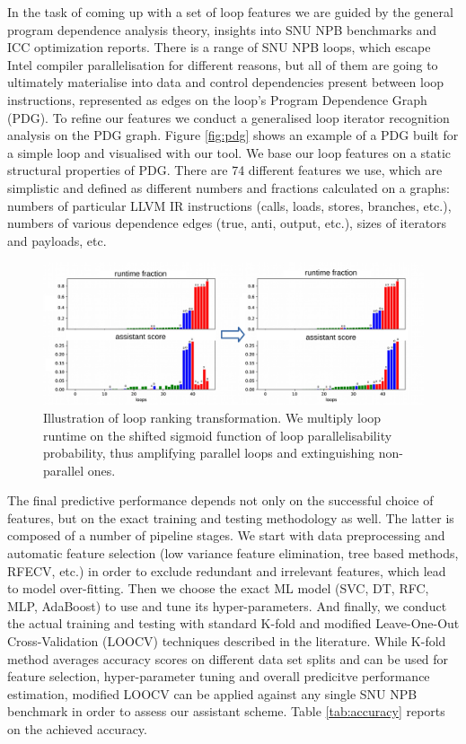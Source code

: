 \documentclass{acaces}
\begin{document}
\quad In the task of coming up with a set of loop features we are guided by the general program dependence analysis theory, insights into SNU NPB benchmarks and ICC optimization reports. There is a range of SNU NPB loops, which escape Intel compiler parallelisation for different reasons, but all of them are going to ultimately materialise into data and control dependencies present between loop instructions, represented as edges on the loop's Program Dependence Graph (PDG). To refine our features we conduct a generalised loop iterator recognition \cite{Manilov:2018:GPI:3178372.3179511} analysis on the PDG graph. Figure \ref{fig:pdg} shows an example of a PDG built for a simple loop and visualised with our tool. We base our loop features on a static structural properties of PDG. There are 74 different features we use, which are simplistic and defined as different numbers and fractions calculated on a graphs: numbers of particular LLVM IR instructions (calls, loads, stores, branches, etc.), numbers of various dependence edges (true, anti, output, etc.), sizes of iterators and payloads, etc.\newline\null
\begin{figure}
	\centering
	\includegraphics[width=1.0\textwidth]{ft_ranking}
	\caption{Illustration of loop ranking transformation. We multiply loop runtime on the shifted sigmoid function of loop parallelisability probability, thus amplifying parallel loops and extinguishing non-parallel ones. }
	\label{ranking}
\end{figure}
\quad The final predictive performance depends not only on the successful choice of features, but on the exact training and testing methodology as well. The latter is composed of a number of pipeline stages. We start with data preprocessing and automatic feature selection (low variance feature elimination, tree based methods, RFECV, etc.) in order to exclude redundant and irrelevant features, which lead to model over-fitting. Then we choose the exact ML model (SVC, DT, RFC, MLP, AdaBoost) to use and tune its hyper-parameters. And finally, we conduct the actual training and testing with standard K-fold and modified Leave-One-Out Cross-Validation (LOOCV)  techniques described in the literature. While K-fold method averages accuracy scores on different data set splits and can be used for feature selection, hyper-parameter tuning and overall predicitve performance estimation, modified LOOCV can be applied against any single SNU NPB benchmark in order to assess our assistant scheme. Table \ref{tab:accuracy} reports on the achieved accuracy.
\end{document}
